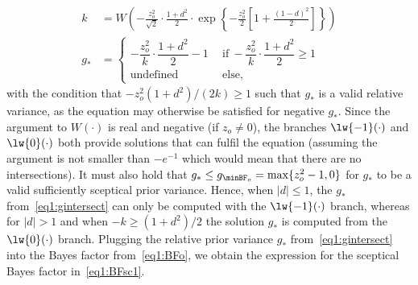 \begin{subappendices}
\begin{align}
  \label{eq1:gintersect}
  k &= W\left(-\frac{z_{o}^{2}}{\sqrt{2}} \cdot \frac{1 + d^{2}}{2} \cdot
      \exp\left\{-\frac{z_o^2}{2} \left[1 + \frac{(1 - d)^2}{2}\right]\right\}\right)
  \nonumber \\
  g_* &=
  \begin{cases}
    -\dfrac{z_o^2}{k}\cdot \dfrac{1 + d^{2}}{2} - 1 & ~~ \text{if} ~
    -\dfrac{z_o^2}{k}\cdot\dfrac{1 + d^{2}}{2} \geq 1 \\
    \text{undefined} & ~~ \text{else},
  \end{cases}
\end{align}
with the condition that $-z_o^2(1 + d^{2})/(2k) \geq 1$ such that $g_*$ is a
valid relative variance, as the equation may otherwise be satisfied for negative
$g_*$. Since the argument to $W(\cdot)$ is real and negative (if $z_{o}\neq 0$),
the branches $\lw{-1}(\cdot)$ and $\lw{0}(\cdot)$ both provide solutions that
can fulfil the equation (assuming the argument is not smaller than $-e^{-1}$
which would mean that there are no intersections). It must also hold that
$g_{*} \leq g_{\minBF_{o}} = \max\{z_{o}^{2} - 1, 0\}$ for $g_{*}$ to be a valid
sufficiently sceptical prior variance. Hence, when $|d| \leq 1$, the $g_{*}$
from~\eqref{eq1:gintersect} can only be computed with the $\lw{-1}(\cdot)$
branch, whereas for $|d| > 1$ and when $-k \geq (1 + d^{2})/2$ the solution
$g_{*}$ is computed from the $\lw{0}(\cdot)$ branch. Plugging the relative prior
variance $g_{*}$ from~\eqref{eq1:gintersect} into the Bayes factor
from~\eqref{eq1:BFo}, we obtain the expression for the sceptical Bayes factor
in~\eqref{eq1:BFsc1}.



\end{subappendices}
